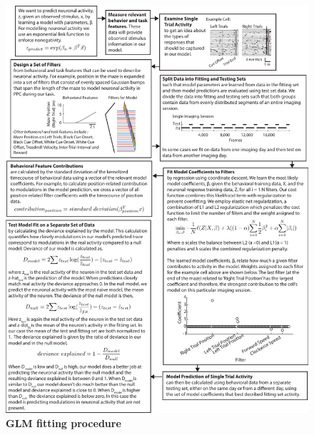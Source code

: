 \begin{figure}
\includegraphics[width=\textwidth]{figures/4_glm_tutorial.pdf}
\caption[GLM fitting procedure]{\textbf{GLM fitting procedure}
\label{fig:4_glm_tutorial}}
\end{figure}


